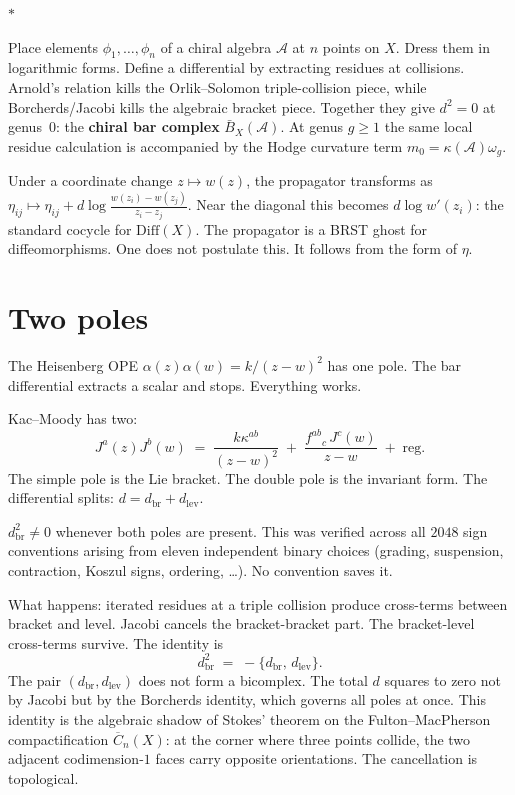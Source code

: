 \documentclass[11pt]{article}
\newcommand{\cA}{\mathcal{A}}
\newcommand{\B}{\bar{B}}
\newcommand{\sep}{\bigskip\begin{center}$*$\end{center}\medskip}
\begin{document}
\sep

Place elements $\phi_1, \ldots, \phi_n$ of a chiral algebra
$\cA$ at $n$ points on $X$.  Dress them in logarithmic forms.
Define a differential by extracting residues at collisions.
Arnold's relation kills the Orlik--Solomon triple-collision
piece, while Borcherds/Jacobi kills the algebraic bracket
piece.  Together they give $d^2 = 0$ at genus~$0$: the
\textbf{chiral bar complex} $\B_X(\cA)$.  At genus $g\geq1$
the same local residue calculation is accompanied by the Hodge
curvature term $m_0=\kappa(\cA)\omega_g$.

Under a coordinate change $z \mapsto w(z)$, the propagator
transforms as
$\eta_{ij} \mapsto \eta_{ij} +
d\log\frac{w(z_i) - w(z_j)}{z_i - z_j}$.
Near the diagonal this becomes $d\log w'(z_i)$: the standard
cocycle for $\mathrm{Diff}(X)$.  The propagator is a BRST ghost
for diffeomorphisms.  One does not postulate this.  It follows
from the form of $\eta$.


\section{Two poles}
\label{sec:two-poles}

The Heisenberg OPE $\alpha(z)\alpha(w) = k/(z-w)^2$ has
one pole.  The bar differential extracts a scalar and
stops.  Everything works.

Kac--Moody has two:
\[
J^a(z) J^b(w) \;=\; \frac{k\kappa^{ab}}{(z-w)^2}
  \;+\; \frac{f^{ab}{}_c\, J^c(w)}{z-w} \;+\; \mathrm{reg}.
\]
The simple pole is the Lie bracket.  The double pole is
the invariant form.  The differential splits: $d = d_{\mathrm{br}}
+ d_{\mathrm{lev}}$.

$d_{\mathrm{br}}^2 \neq 0$ whenever both poles are present.
This was verified across all $2048$ sign conventions arising
from eleven independent binary choices (grading, suspension,
contraction, Koszul signs, ordering, \ldots).  No convention
saves it.

What happens: iterated residues at a triple collision produce
cross-terms between bracket and level.  Jacobi cancels the
bracket-bracket part.  The bracket-level cross-terms survive.
The identity is
\begin{equation}\label{eq:cross-term}
d_{\mathrm{br}}^2 \;=\; -\{d_{\mathrm{br}},\, d_{\mathrm{lev}}\}.
\end{equation}
The pair $(d_{\mathrm{br}}, d_{\mathrm{lev}})$ does not form a
bicomplex.  The total $d$ squares to zero not by Jacobi but by
the Borcherds identity, which governs all poles at once.  This
identity is the algebraic shadow of Stokes' theorem on the
Fulton--MacPherson compactification $\overline{C}_n(X)$: at the
corner where three points collide, the two adjacent codimension-$1$
faces carry opposite orientations.  The cancellation is topological.
\end{document}
